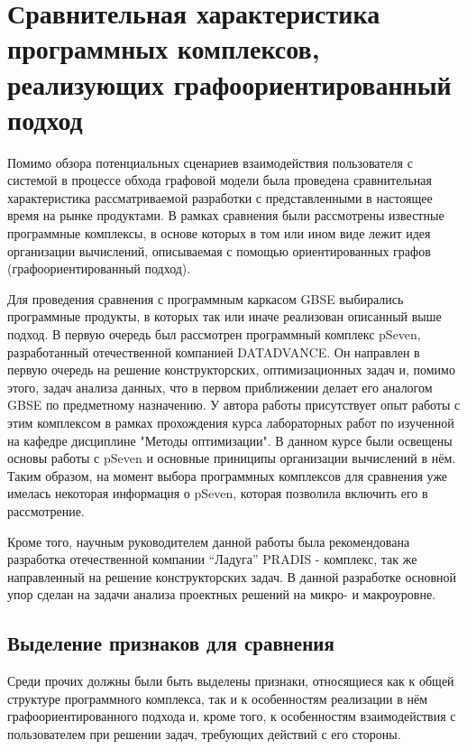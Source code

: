 \chapter{Сравнительная характеристика программных комплексов, реализующих графоориентированный подход}
Помимо обзора потенциальных сценариев взаимодействия пользователя с системой в процессе обхода графовой модели была проведена сравнительная характеристика рассматриваемой разработки с представленными в настоящее время на рынке продуктами.
В рамках сравнения были рассмотрены известные программные комплексы, в основе которых в том или ином виде лежит идея организации вычислений, описываемая с помощью ориентированных графов (графоориентированный подход).

Для проведения сравнения с программным каркасом GBSE выбирались программные продукты, в которых так или иначе реализован описанный выше подход. В первую очередь был рассмотрен программный комплекс pSeven, разработанный отечественной компанией DATADVANCE. Он направлен в первую очередь на решение конструкторских, оптимизационных задач и, помимо этого, задач анализа данных, что в первом приближении делает его аналогом GBSE по предметному назначению. У автора работы присутствует опыт работы с этим комплексом в рамках прохождения курса лабораторных работ по изученной на кафедре дисциплине "Методы оптимизации". В данном курсе были освещены основы работы с pSeven и основные приниципы организации вычислений в нём. Таким образом, на момент выбора программных комплексов для сравнения уже имелась некоторая информация о pSeven, которая позволила включить его в рассмотрение.

Кроме того, научным руководителем данной работы была рекомендована разработка отечественной компании ``Ладуга'' PRADIS - комплекс, так же направленный на решение конструкторских задач. В данной разработке основной упор сделан на задачи анализа проектных решений на микро- и макроуровне.

\section{Выделение признаков для сравнения}


Среди прочих должны были быть выделены признаки, относящиеся как к общей структуре программного комплекса, так и к особенностям реализации в нём графоориентированного подхода и, кроме того, к особенностям взаимодействия с пользователем при решении задач, требующих действий с его стороны.

